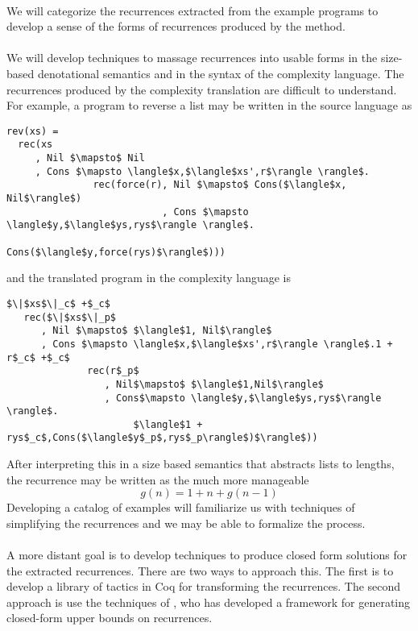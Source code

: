 \paragraph{}
We will categorize the recurrences extracted from the example programs to develop a sense of the forms of recurrences produced by the method.

\paragraph{}
We will develop techniques to massage recurrences into usable forms in the size-based denotational semantics and in the syntax of the complexity language.
The recurrences produced by the complexity translation are difficult to understand.
For example, a program to reverse a list may be written in the source language as

\begin{lstlisting}[mathescape=true,breaklines=true]
rev(xs) =
  rec(xs
     , Nil $\mapsto$ Nil
     , Cons $\mapsto \langle$x,$\langle$xs',r$\rangle \rangle$.
               rec(force(r), Nil $\mapsto$ Cons($\langle$x, Nil$\rangle$)
                           , Cons $\mapsto \langle$y,$\langle$ys,rys$\rangle \rangle$.
                                      Cons($\langle$y,force(rys)$\rangle$)))
\end{lstlisting}

and the translated program in the complexity language is

\begin{lstlisting}[mathescape=true,breaklines=true]
$\|$xs$\|_c$ +$_c$
   rec($\|$xs$\|_p$
      , Nil $\mapsto$ $\langle$1, Nil$\rangle$
      , Cons $\mapsto \langle$x,$\langle$xs',r$\rangle \rangle$.1 + r$_c$ +$_c$
              rec(r$_p$
                 , Nil$\mapsto$ $\langle$1,Nil$\rangle$
                 , Cons$\mapsto \langle$y,$\langle$ys,rys$\rangle \rangle$.
                      $\langle$1 + rys$_c$,Cons($\langle$y$_p$,rys$_p\rangle$)$\rangle$))
\end{lstlisting}

After interpreting this in a size based semantics that abstracts lists to lengths, the recurrence may be written as the much more manageable
\[ g(n) = 1 + n + g(n-1) \]
Developing a catalog of examples will familiarize us with techniques of simplifying the recurrences and we may be able to formalize the process.

\paragraph*{}
A more distant goal is to develop techniques to produce closed form solutions for the extracted recurrences.
There are two ways to approach this.
The first is to develop a library of tactics in Coq for transforming the recurrences.
The second approach is use the techniques of \citet{Albert2011}, who has developed a framework for generating closed-form upper bounds on recurrences.
